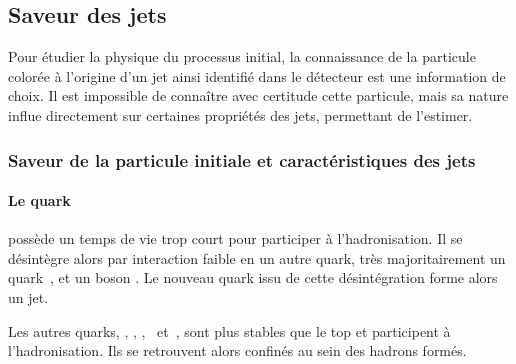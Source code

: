 \subsection{Saveur des jets}\label{chapter-JERC-section-jets_reco-subsec-flavor}
Pour étudier la physique du processus initial, la connaissance de la particule colorée à l'origine d'un jet ainsi identifié dans le détecteur est une information de choix.
Il est impossible de connaître avec certitude cette particule, mais sa nature influe directement sur certaines propriétés des jets, permettant de l'estimer.
\subsubsection{Saveur de la particule initiale et caractéristiques des jets}
\paragraph{Le quark~\quarkt} possède un temps de vie trop court pour participer à l'hadronisation. Il se désintègre alors par interaction faible en un autre quark, très majoritairement un quark~\quarkb, et un boson \Wboson. Le nouveau quark issu de cette désintégration forme alors un jet.
\par Les autres quarks, \quarkd, \quarku, \quarks, \quarkc\ et~\quarkb, sont plus stables que le top et participent à l'hadronisation.
Ils se retrouvent alors confinés au sein des hadrons formés.
